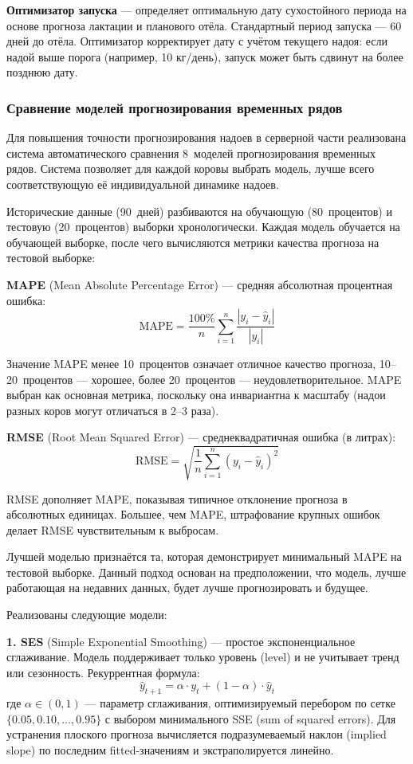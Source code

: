 \textbf{Оптимизатор запуска} --- определяет оптимальную дату сухостойного периода на основе прогноза лактации и планового отёла. Стандартный период запуска --- 60 дней до отёла. Оптимизатор корректирует дату с учётом текущего надоя: если надой выше порога (например, 10 кг/день), запуск может быть сдвинут на более позднюю дату.

\subsubsection{Сравнение моделей прогнозирования временных рядов}

Для повышения точности прогнозирования надоев в серверной части реализована система автоматического сравнения 8~моделей прогнозирования временных рядов. Система позволяет для каждой коровы выбрать модель, лучше всего соответствующую её индивидуальной динамике надоев.

Исторические данные (90~дней) разбиваются на обучающую (80~процентов) и тестовую (20~процентов) выборки хронологически. Каждая модель обучается на обучающей выборке, после чего вычисляются метрики качества прогноза на тестовой выборке:

\textbf{MAPE} (Mean Absolute Percentage Error) --- средняя абсолютная процентная ошибка:
$$\text{MAPE} = \frac{100\%}{n} \sum_{i=1}^{n} \frac{|y_i - \hat{y}_i|}{|y_i|}$$

Значение MAPE менее 10~процентов означает отличное качество прогноза, 10--20~процентов --- хорошее, более 20~процентов --- неудовлетворительное. MAPE выбран как основная метрика, поскольку она инвариантна к масштабу (надои разных коров могут отличаться в 2--3 раза).

\textbf{RMSE} (Root Mean Squared Error) --- среднеквадратичная ошибка (в литрах):
$$\text{RMSE} = \sqrt{\frac{1}{n} \sum_{i=1}^{n} (y_i - \hat{y}_i)^2}$$

RMSE дополняет MAPE, показывая типичное отклонение прогноза в абсолютных единицах. Большее, чем MAPE, штрафование крупных ошибок делает RMSE чувствительным к выбросам.

Лучшей моделью признаётся та, которая демонстрирует минимальный MAPE на тестовой выборке. Данный подход основан на предположении, что модель, лучше работающая на недавних данных, будет лучше прогнозировать и будущее.

Реализованы следующие модели:

\textbf{1. SES} (Simple Exponential Smoothing) --- простое экспоненциальное сглаживание. Модель поддерживает только уровень (level) и не учитывает тренд или сезонность. Рекуррентная формула:
$$\hat{y}_{t+1} = \alpha \cdot y_t + (1 - \alpha) \cdot \hat{y}_t$$
где $\alpha \in (0, 1)$ --- параметр сглаживания, оптимизируемый перебором по сетке $\{0.05, 0.10, \ldots, 0.95\}$ с выбором минимального SSE (sum of squared errors). Для устранения плоского прогноза вычисляется подразумеваемый наклон (implied slope) по последним fitted-значениям и экстраполируется линейно.

